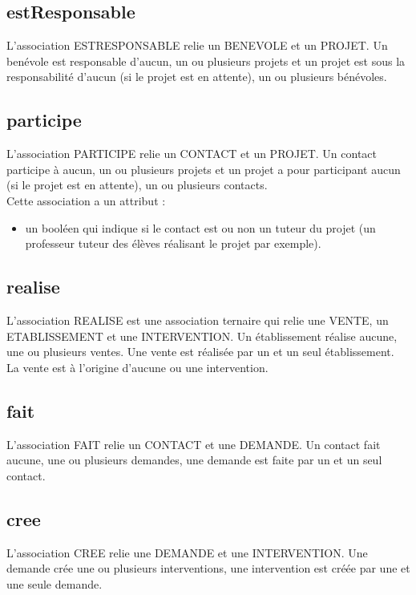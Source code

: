 \documentclass[asi, sansVersion]{picInsa}
\begin{document}
\subsection*{estResponsable}
L'association ESTRESPONSABLE relie un BENEVOLE et un PROJET. Un benévole est responsable d'aucun, un ou plusieurs projets et un projet est sous la responsabilité d'aucun (si le projet est en attente), un ou plusieurs bénévoles.

\subsection*{participe}
L'association PARTICIPE relie un CONTACT et un PROJET. Un contact participe à aucun, un ou plusieurs projets et un projet a pour participant aucun (si le projet est en attente), un ou plusieurs contacts.\\
Cette association a un attribut :
\begin{itemize}
\item un booléen qui indique si le contact est ou non un tuteur du projet (un professeur tuteur des élèves réalisant le projet par exemple). 
\end{itemize}

\subsection*{realise}

L'association REALISE est une association ternaire qui relie une VENTE, un ETABLISSEMENT et une INTERVENTION. Un établissement réalise aucune, une ou plusieurs ventes. Une vente est réalisée par un et un seul établissement. La vente est à l'origine d'aucune ou une intervention.

\subsection*{fait}

L'association FAIT relie un CONTACT et une DEMANDE. Un contact fait aucune, une ou plusieurs demandes, une demande est faite par un et un seul contact.

\subsection*{cree}

L'association CREE relie une DEMANDE et une INTERVENTION. Une demande crée une ou plusieurs interventions, une intervention est créée par une et une seule demande.
\end{document}
